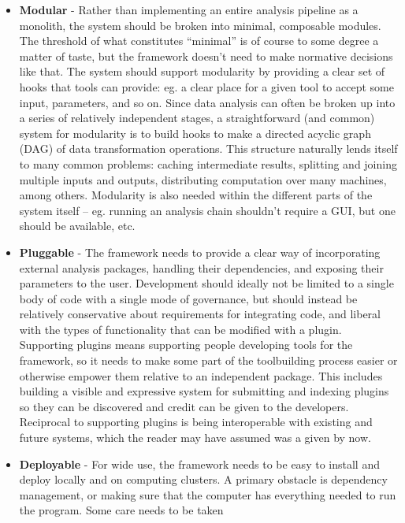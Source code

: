\documentclass[10pt]{tufte-book}
\begin{document}
\begin{itemize}

\item
  \textbf{Modular} - Rather than implementing an entire analysis
  pipeline as a monolith, the system should be broken into minimal,
  composable modules. The threshold of what constitutes ``minimal'' is
  of course to some degree a matter of taste, but the framework doesn't
  need to make normative decisions like that. The system should support
  modularity by providing a clear set of hooks that tools can provide:
  eg. a clear place for a given tool to accept some input, parameters,
  and so on. Since data analysis can often be broken up into a series of
  relatively independent stages, a straightforward (and common) system
  for modularity is to build hooks to make a directed acyclic graph
  (DAG) of data transformation operations. This structure naturally
  lends itself to many common problems: caching intermediate results,
  splitting and joining multiple inputs and outputs, distributing
  computation over many machines, among others. Modularity is also
  needed within the different parts of the system itself -- eg. running
  an analysis chain shouldn't require a GUI, but one should be
  available, etc.
\item
  \textbf{Pluggable} - The framework needs to provide a clear way of
  incorporating external analysis packages, handling their dependencies,
  and exposing their parameters to the user. Development should ideally
  not be limited to a single body of code with a single mode of
  governance, but should instead be relatively conservative about
  requirements for integrating code, and liberal with the types of
  functionality that can be modified with a plugin. Supporting plugins
  means supporting people developing tools for the framework, so it
  needs to make some part of the toolbuilding process easier or
  otherwise empower them relative to an independent package. This
  includes building a visible and expressive system for submitting and
  indexing plugins so they can be discovered and credit can be given to
  the developers. Reciprocal to supporting plugins is being
  interoperable with existing and future systems, which the reader may
  have assumed was a given by now.
\item
  \textbf{Deployable} - For wide use, the framework needs to be easy to
  install and deploy locally and on computing clusters. A primary
  obstacle is dependency management, or making sure that the computer
  has everything needed to run the program. Some care needs to be taken

\end{itemize}
\end{document}
